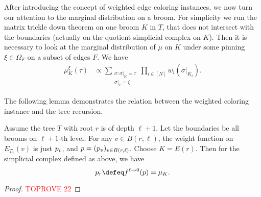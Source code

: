 \documentclass[a4paper,11pt]{article}
\begin{document}
After introducing the concept of weighted edge coloring instances, we now turn our attention to the marginal distribution on a broom. For simplicity we run the matrix trickle down theorem on one broom $K$ in $T$,
that does not intersect with the boundaries
(actually on the quotient simplicial complex on $K$).
Then it is necessary to look at the marginal distribution of $\mu$
on $K$ under some pinning $\xi \in \Omega_F$ on a subset of edges $F$.
We have
\begin{align}\label{eq:broom-marginal-1}
\mu^\xi_K(\tau)
&\propto \sum_{\substack{\sigma:\sigma|_K=\tau \\ \sigma|_F=\xi}}
 \prod_{i\in [N]} w_i(\sigma|_{K_i}).
\end{align}

The following lemma demonstrates the relation between the weighted coloring instance and the tree recursion.
\begin{lemma}\label{lem:p=mu}
    Assume the tree $T$ with root $r$ is of depth $\ell+1$. Let the boundaries be all brooms on $\ell+1$-th level.
    For any $v\in B(r,\ell)$, the weight function on $E_{T_v}(v)$ is just $\*p_v$, and $\*p=(\*p_v)_{v\in B(r,\ell)}$. Choose $K=E(r)$. Then for the simplicial complex defined as above, we have  \[\*p_r\defeq  f^{\ell\rightarrow 0}(\*p)= \mu_K .\]
\end{lemma}
\begin{proof}\textcolor{red}{TOPROVE 22}\end{proof}
\end{document}
